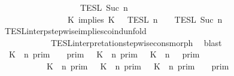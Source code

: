 \begin{isabellebody}
\ \ \ \ \ \ \ \ \ \ \ \ \ \ \ \ {\isasyminter}\ {\isasymlbrakk}{\isasymlbrakk}\ {\isasymPhi}\ {\isasymrbrakk}{\isasymrbrakk}\isactrlsub T\isactrlsub E\isactrlsub S\isactrlsub L\isactrlbsup {\isasymge}\ Suc\ n\isactrlesup {\isacharparenright}\isanewline
\ \ \ \ \ \ \ \ \ \ \ \ \ \ {\isacharequal}\ {\isasymlbrakk}{\isasymlbrakk}\ {\isacharparenleft}K\ implies\ K\ {\isacharhash}\ {\isasymPsi}\ {\isasymrbrakk}{\isasymrbrakk}\isactrlsub T\isactrlsub E\isactrlsub S\isactrlsub L\isactrlbsup {\isasymge}\ n\isactrlesup \ {\isasyminter}\ {\isasymlbrakk}{\isasymlbrakk}\ {\isasymPhi}\ {\isasymrbrakk}{\isasymrbrakk}\isactrlsub T\isactrlsub E\isactrlsub S\isactrlsub L\isactrlbsup {\isasymge}\ Suc\ n\isactrlesup {\isacartoucheclose}\isanewline
\ \ \ \ \ \ \isamarkupfalse%
\ TESL{\isacharunderscore}interp{\isacharunderscore}stepwise{\isacharunderscore}implies{\isacharunderscore}coind{\isacharunderscore}unfold\isanewline
\ \ \ \ \ \ \ \ \ \ \ \ TESL{\isacharunderscore}interpretation{\isacharunderscore}stepwise{\isacharunderscore}cons{\isacharunderscore}morph\ \isamarkupfalse%
\ blast\isanewline
\ \ \ \ \isamarkupfalse%
\ {\isacartoucheopen}{\isasymlbrakk}\ K\ {\isasymnot}{\isasymUp}\ n\ {\isasymrbrakk}\isactrlsub p\isactrlsub r\isactrlsub i\isactrlsub m\ {\isasyminter}\ {\isasymlbrakk}{\isasymlbrakk}\ {\isasymGamma}\ {\isasymrbrakk}{\isasymrbrakk}\isactrlsub p\isactrlsub r\isactrlsub i\isactrlsub m\ {\isasymunion}\ {\isasymlbrakk}\ K\ {\isasymUp}\ n\ {\isasymrbrakk}\isactrlsub p\isactrlsub r\isactrlsub i\isactrlsub m\ {\isasyminter}\ {\isasymlbrakk}{\isasymlbrakk}\ {\isacharparenleft}K\ {\isasymUp}\ n{\isacharparenright}\ {\isacharhash}\ {\isasymGamma}\ {\isasymrbrakk}{\isasymrbrakk}\isactrlsub p\isactrlsub r\isactrlsub i\isactrlsub m\isanewline
\ \ \ \ \ \ \ \ \ {\isacharequal}\ {\isacharparenleft}{\isasymlbrakk}\ K\ {\isasymnot}{\isasymUp}\ n\ {\isasymrbrakk}\isactrlsub p\isactrlsub r\isactrlsub i\isactrlsub m\ {\isasymunion}\ {\isasymlbrakk}\ K\ {\isasymUp}\ n\ {\isasymrbrakk}\isactrlsub p\isactrlsub r\isactrlsub i\isactrlsub m\ {\isasyminter}\ {\isasymlbrakk}\ K\ {\isasymUp}\ n\ {\isasymrbrakk}\isactrlsub p\isactrlsub r\isactrlsub i\isactrlsub m{\isacharparenright}\ {\isasyminter}\ {\isasymlbrakk}{\isasymlbrakk}\ {\isasymGamma}\ {\isasymrbrakk}{\isasymrbrakk}\isactrlsub p\isactrlsub r\isactrlsub i\isactrlsub m{\isacartoucheclose}\isanewline

\end{isabellebody}
